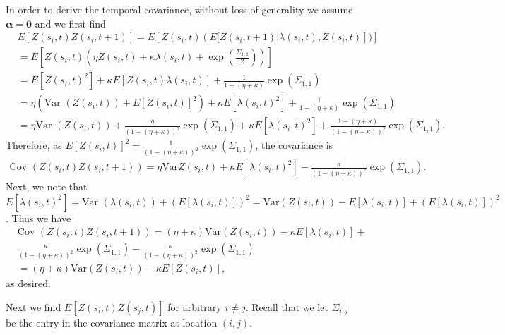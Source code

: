 \documentclass[11pt]{isuthesis}
\begin{document}
In order to derive the temporal covariance, without loss of generality we assume $\boldsymbol{\alpha}=\boldsymbol{0}$ and we first find
\begin{align}
	& E\left[Z(s_i,t)Z(s_i,t+1)\right] = E\left[Z(s_i,t)\left(E[Z(s_i,t+1)|\lambda(s_i,t),Z(s_i,t)\right])\right]\\
	& = E\left[Z(s_i,t)\left(\eta Z(s_i,t)+\kappa \lambda(s_i,t)+\exp(\frac{\Sigma_{1,1}}{2})\right)\right]\\
	& = E\left[Z(s_i,t)^2\right]+\kappa E\left[Z(s_i,t)\lambda(s_i,t)\right]+\frac{1}{1-(\eta+\kappa)}\exp(\Sigma_{1,1})\\
	& = \eta \left(\mbox{Var }(Z(s_i,t))+E[Z(s_i,t)]^2\right)+\kappa E[\lambda(s_i,t)^2]+\frac{1}{1-(\eta+\kappa)}\exp(\Sigma_{1,1})\\
	& = \eta \mbox{Var }(Z(s_i,t))+\frac{\eta}{(1-(\eta+\kappa))^2}\exp(\Sigma_{1,1})+\kappa E[\lambda(s_i,t)^2]+\frac{1-(\eta+\kappa)}{(1-(\eta+\kappa))^2}\exp(\Sigma_{1,1}).
\end{align}
Therefore, as $E[Z(s_i,t)]^2=\frac{1}{(1-(\eta+\kappa))^2}\exp(\Sigma_{1,1})$, the covariance is
\begin{align}
	\mbox{Cov }(Z(s_i,t)Z(s_i,t+1))=\eta \mbox{Var}Z(s_i,t)+\kappa E[\lambda(s_i,t)^2]-\frac{\kappa}{(1-(\eta+\kappa))^2}\exp(\Sigma_{1,1}).
\end{align}
Next, we note that $E[\lambda(s_i,t)^2]=\mbox{Var }(\lambda(s_i,t))+\left(E[\lambda(s_i,t)]\right)^2=\mbox{Var}(Z(s_i,t))-E[\lambda(s_i,t)]+\left(E[\lambda(s_i,t)]\right)^2$.  Thus we have
\begin{align}
	& \mbox{Cov }(Z(s_i,t)Z(s_i,t+1))=\left(\eta+\kappa\right)\mbox{Var}(Z(s_i,t))-\kappa E[\lambda(s_i,t)]+\nonumber\\
	&\frac{\kappa}{(1-(\eta+\kappa))^2}\exp(\Sigma_{1,1})-\frac{\kappa}{(1-(\eta+\kappa))^2}\exp(\Sigma_{1,1})\\
	&=\left(\eta+\kappa\right)\mbox{Var}(Z(s_i,t))-\kappa E[Z(s_i,t)],
\end{align}
as desired.

Next we find $E[Z(s_i,t)Z(s_j,t)]$ for arbitrary $i \neq j$.  Recall that we let $\Sigma_{i,j}$ be the entry in the covariance matrix at location $(i,j)$.
\end{document}
